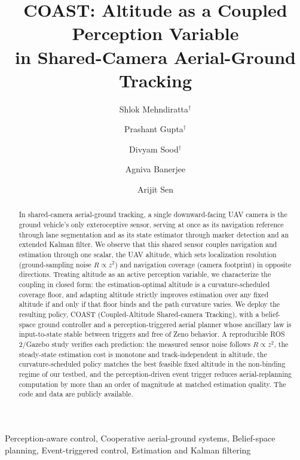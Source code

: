 \documentclass{ifacconf}
\begin{document}
\begin{frontmatter}

\title{COAST: Altitude as a Coupled Perception Variable\\ in Shared-Camera Aerial-Ground Tracking}

\author[First]{Shlok Mehndiratta$^{\dagger}$}
\author[First]{Prashant Gupta$^{\dagger}$} 
\author[First]{Divyam Sood$^{\dagger}$} 
\author[First]{Agniva Banerjee} 
\author[First]{Arijit Sen}
\address[First]{Department of Electrical Engineering and Computer Science, IISER Bhopal, India. (e-mail: \{shlokm23, prashant23, divyam23, agniva24, ajsen\}@iiserb.ac.in).}

\begin{abstract}
In shared-camera aerial-ground tracking, a single downward-facing UAV camera is the ground vehicle's only
exteroceptive sensor, serving at once as its navigation reference through lane segmentation and as its
state estimator through marker detection and an extended Kalman filter. We observe that this shared sensor
couples navigation and estimation through one scalar, the UAV altitude, which sets localization resolution
(ground-sampling noise $R\propto z^2$) and navigation coverage (camera footprint) in opposite directions.
Treating altitude as an active perception variable, we characterize the coupling in closed form: the
estimation-optimal altitude is a curvature-scheduled coverage floor, and adapting altitude strictly
improves estimation over any fixed altitude if and only if that floor binds and the path curvature varies.
We deploy the resulting policy, COAST (Coupled-Altitude Shared-camera Tracking), with a belief-space
ground controller and a perception-triggered aerial planner whose ancillary law is input-to-state stable
between triggers and free of Zeno behavior. A
reproducible ROS\,2/Gazebo study verifies each prediction: the measured sensor noise follows $R\propto z^2$,
the steady-state estimation cost is monotone and track-independent in altitude, the curvature-scheduled
policy matches the best feasible fixed altitude in the non-binding regime of our testbed, and the
perception-driven event trigger reduces aerial-replanning computation by more than an order of magnitude at
matched estimation quality. The code and data are publicly available.
\end{abstract}

\begin{keyword}
Perception-aware control, Cooperative aerial-ground systems, Belief-space planning,
Event-triggered control, Estimation and Kalman filtering
\end{keyword}

\end{frontmatter}
\end{document}
